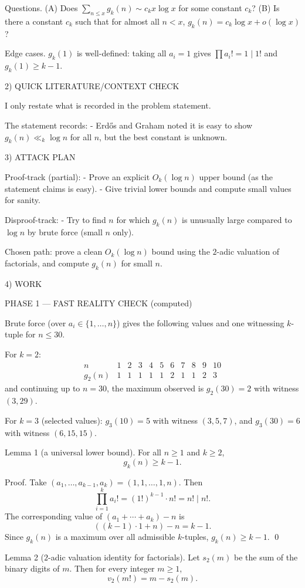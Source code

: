 Questions.
(A) Does $\sum_{n\le x} g_k(n)\sim c_k x\log x$ for some constant $c_k$?
(B) Is there a constant $c_k$ such that for almost all $n<x$, $g_k(n)=c_k\log x+o(\log x)$?

Edge cases.
$g_k(1)$ is well-defined: taking all $a_i=1$ gives $\prod a_i!=1\mid 1!$ and $g_k(1)\ge k-1$.

2) QUICK LITERATURE/CONTEXT CHECK

I only restate what is recorded in the problem statement.

The statement records:
- Erd\H{o}s and Graham noted it is easy to show $g_k(n)\ll_k \log n$ for all $n$, but the best constant is unknown.

3) ATTACK PLAN

Proof-track (partial):
- Prove an explicit $O_k(\log n)$ upper bound (as the statement claims is easy).
- Give trivial lower bounds and compute small values for sanity.

Disproof-track:
- Try to find $n$ for which $g_k(n)$ is unusually large compared to $\log n$ by brute force (small $n$ only).

Chosen path: prove a clean $O_k(\log n)$ bound using the $2$-adic valuation of factorials, and compute $g_k(n)$ for small $n$.

4) WORK

PHASE 1 — FAST REALITY CHECK (computed)

Brute force (over $a_i\in\{1,\dots,n\}$) gives the following values and one witnessing $k$-tuple for $n\le 30$.

For $k=2$:
\[
\begin{array}{c|cccccccccc}
 n&1&2&3&4&5&6&7&8&9&10\\\hline
 g_2(n)&1&1&1&1&1&2&1&1&2&3
\end{array}
\]
and continuing up to $n=30$, the maximum observed is $g_2(30)=2$ with witness $(3,29)$.

For $k=3$ (selected values):
$g_3(10)=5$ with witness $(3,5,7)$, and $g_3(30)=6$ with witness $(6,15,15)$.

Lemma 1 (a universal lower bound).
For all $n\ge 1$ and $k\ge 2$,
\[
 g_k(n)\ge k-1.
\]

Proof.
Take $(a_1,\dots,a_{k-1},a_k)=(1,1,\dots,1,n)$. Then
\[
\prod_{i=1}^k a_i! = (1!)^{k-1}\cdot n! = n!\mid n!.
\]
The corresponding value of $(a_1+\cdots+a_k)-n$ is
\[
((k-1)\cdot 1+n)-n=k-1.
\]
Since $g_k(n)$ is a maximum over all admissible $k$-tuples, $g_k(n)\ge k-1$. \qed

Lemma 2 ($2$-adic valuation identity for factorials).
Let $s_2(m)$ be the sum of the binary digits of $m$.
Then for every integer $m\ge 1$,
\[
 v_2(m!) = m - s_2(m).
\]

